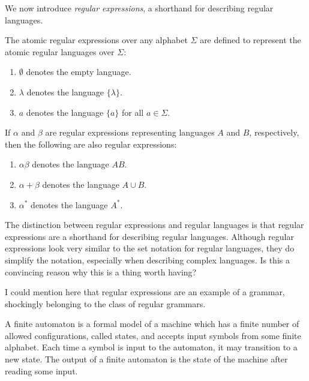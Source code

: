 \documentclass{bcthesis}
\renewcommand{\meo}{}
\begin{document}
	We now introduce \textit{regular expressions}, a shorthand for describing regular languages.

	\begin{definition}
		The atomic regular expressions over any alphabet $\Sigma$ are defined to represent the atomic regular languages over $\Sigma$:
		\begin{enumerate}[label=(\roman*), itemsep = -0.3 ex]
			\item $\emptyset$ denotes the empty language.
			\item $\lambda$ denotes the language $\{ \lambda \}$.
			\item $a$ denotes the language $\{ a \}$ for all $a \in \Sigma$.
		\end{enumerate}

		If $\alpha$ and $\beta$ are regular expressions representing languages $A$ and $B$, respectively, then the following are also regular expressions:
		\begin{enumerate}[label=(\roman*), itemsep = -0.3 ex]
			\item $\alpha \beta$ denotes the language $AB$.
			\item $\alpha + \beta$ denotes the language $A \cup B$.
			\item $\alpha^*$ denotes the language $A^*$.
		\end{enumerate}
	\end{definition}

	\begin{remark}
		The distinction between regular expressions and regular languages is that regular expressions are a shorthand for describing regular languages. 
		Although regular expressions look very similar to the set notation for regular languages, they do simplify the notation, especially when describing complex languages.
		\meo{
			Is this a convincing reason why this is a thing worth having?
		}

	\end{remark}

	\meo{
		I could mention here that regular expressions are an example of a grammar, shockingly belonging to the class of regular grammars.
	}


\label{ch:finite_automata}

	A finite automaton is a formal model of a machine which has a finite number of allowed configurations, called states, and accepts input symbols from some finite alphabet. 
	Each time a symbol is input to the automaton, it may transition to a new state. 
	The output of a finite automaton is the state of the machine after reading some input.
\end{document}
